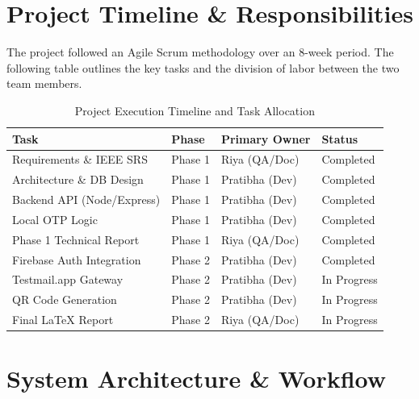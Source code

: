\documentclass[12pt,a4paper]{article}
\begin{document}
\section{Project Timeline \& Responsibilities}
The project followed an Agile Scrum methodology over an 8-week period. The following table outlines the key tasks and the division of labor between the two team members.

\begin{table}[h]
    \centering
    \small
    \begin{tabular}{@{}llll@{}}
        \toprule
        \textbf{Task} & \textbf{Phase} & \textbf{Primary Owner} & \textbf{Status} \\ \midrule
        Requirements \& IEEE SRS & Phase 1 & Riya (QA/Doc) & Completed \\
        Architecture \& DB Design & Phase 1 & Pratibha (Dev) & Completed \\
        Backend API (Node/Express) & Phase 1 & Pratibha (Dev) & Completed \\
        Local OTP Logic & Phase 1 & Pratibha (Dev) & Completed \\
        Phase 1 Technical Report & Phase 1 & Riya (QA/Doc) & Completed \\ \midrule
        Firebase Auth Integration & Phase 2 & Pratibha (Dev) & Completed \\
        Testmail.app Gateway & Phase 2 & Pratibha (Dev) & In Progress \\
        QR Code Generation & Phase 2 & Pratibha (Dev) & In Progress \\
        Final LaTeX Report & Phase 2 & Riya (QA/Doc) & In Progress \\ \bottomrule
    \end{tabular}
    \caption{Project Execution Timeline and Task Allocation}
\end{table}

\section{System Architecture \& Workflow}
\end{document}
